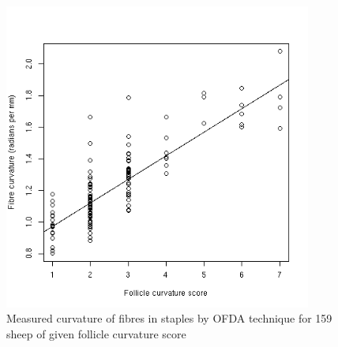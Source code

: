 %

\begin{figure}[!h]
  \centering
   \includegraphics[width=0.9\textwidth]{ofdarads.png}
  \caption{Measured curvature of fibres in staples by OFDA technique for 159 sheep of   given follicle curvature score}
  \label{fig:ofdarads}
\end{figure}

%

